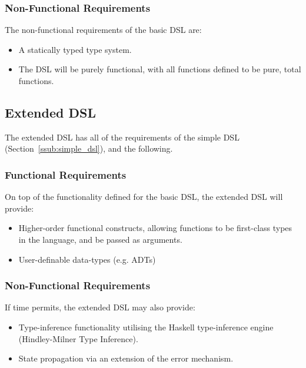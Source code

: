 \documentclass[a4paper,11pt]{report}
\begin{document}

\subsubsection{Non-Functional Requirements} %
\label{ssub:non_functional_requirements_simple}
The non-functional requirements of the basic DSL are:
\begin{itemize}
    \item A statically typed type system.
    \item The DSL will be purely functional, with all functions defined to be pure, total functions.
\end{itemize}



\subsection{Extended DSL} %
\label{sub:extended_dsl}
The extended DSL has all of the requirements of the simple DSL (Section~\ref{ssub:simple_dsl}), and the following.

\subsubsection{Functional Requirements} %
\label{ssub:functional_requirements_extended}
On top of the functionality defined for the basic DSL, the extended DSL will provide:
\begin{itemize}
    \item Higher-order functional constructs, allowing functions to be first-class types in the language, and be passed as arguments.
    \item User-definable data-types (e.g. ADTs)
\end{itemize}


\subsubsection{Non-Functional Requirements} %
\label{ssub:non_functional_requirements_extended}
If time permits, the extended DSL may also provide:
\begin{itemize}
    \item Type-inference functionality utilising the Haskell type-inference engine (Hindley-Milner Type Inference).
    \item State propagation via an extension of the error mechanism.
\end{itemize}
\end{document}
